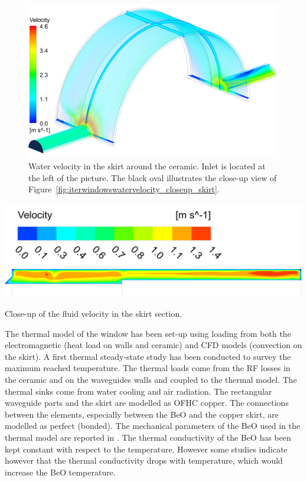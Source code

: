 \begin{figure}
	\centering
	\includegraphics[width=1.0\linewidth]{figures/chap3/ITER_window/ITER_windows_water_velocity}
	\caption{Water velocity in the skirt around the ceramic. Inlet is located at the left of the picture. The black oval illustrates the close-up view of Figure~\ref{fig:iterwindowswatervelocity_closeup_skirt}.}
	\label{fig:iterwindowswatervelocity}
\end{figure}

\begin{marginfigure}[-5cm]
	\centering
	\includegraphics[width=1.0\linewidth]{figures/chap3/ITER_window/ITER_windows_water_velocity_closeup_skirt}
	\caption{Close-up of the fluid velocity in the skirt section.}
	\label{fig:iterwindowswatervelocity_closeup_skirt}
\end{marginfigure}

The thermal model of the window has been set-up using loading from both the electromagnetic (heat load on walls and ceramic) and CFD models (convection on the skirt). A first thermal steady-state study has been conducted to survey the maximum reached temperature. The thermal loads come from the RF losses in the ceramic and on the waveguides walls and coupled to the thermal model. The thermal sinks come from water cooling and air radiation. The rectangular waveguide parts and the skirt are modelled as OFHC copper. The connections between the elements, especially between the BeO and the copper skirt, are modelled as perfect (bonded). The mechanical parameters of the BeO used in the thermal model are reported in \cite{hillairet2015}. The thermal conductivity of the BeO has been kept constant with respect to the temperature. However some studies indicate however that the thermal conductivity drops with temperature, which would increase the BeO temperature. 


